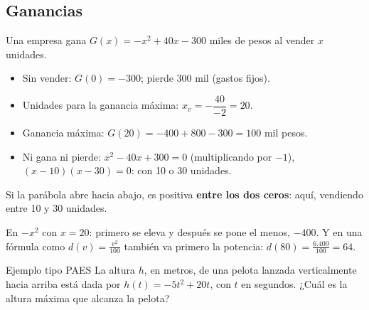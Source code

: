 \subsection{Ganancias}
\par\noindent\begin{minipage}{0.55\linewidth}
Una empresa gana $G(x) = -x^2 + 40x - 300$ miles de pesos al vender $x$ unidades.
\begin{itemize}
  \item Sin vender: $G(0) = -300$; pierde 300 mil (gastos fijos).
  \item Unidades para la ganancia máxima: $x_v = -\dfrac{40}{-2} = 20$.
  \item Ganancia máxima: $G(20) = -400 + 800 - 300 = 100$ mil pesos.
  \item Ni gana ni pierde: $x^2 - 40x + 300 = 0$ (multiplicando por $-1$), $(x - 10)(x - 30) = 0$: con 10 o 30 unidades.
\end{itemize}
\end{minipage}\hfill
\begin{minipage}{0.4\linewidth}\centering
{}
\end{minipage}
\begin{clave} Si la parábola abre hacia abajo, es positiva \textbf{entre los dos ceros}: aquí, vendiendo entre 10 y 30 unidades.\end{clave}
\begin{ojo} En $-x^2$ con $x = 20$: primero se eleva y después se pone el menos, $-400$. Y en una fórmula como $d(v) = \frac{v^2}{100}$ también va primero la potencia: $d(80) = \frac{6.400}{100} = 64$.\end{ojo}

\begin{elejemplo}{Ejemplo tipo PAES}
La altura $h$, en metros, de una pelota lanzada verticalmente hacia arriba está dada por $h(t) = -5t^2 + 20t$, con $t$ en segundos. ¿Cuál es la altura máxima que alcanza la pelota?
\end{elejemplo}

